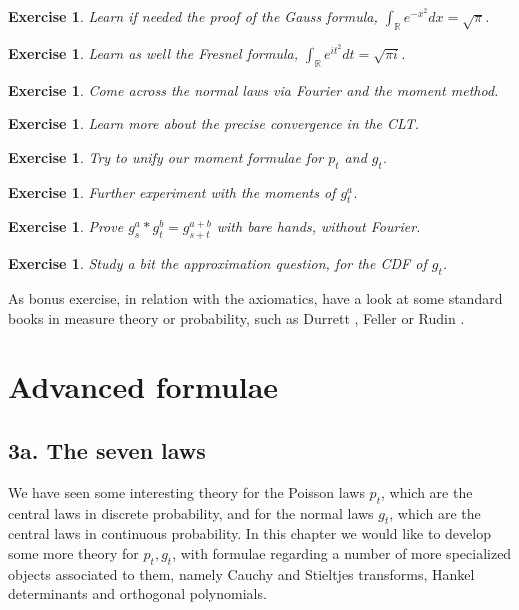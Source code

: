 \documentclass[12pt]{amsbook}
\newtheorem{exercise}[theorem]{Exercise}
\begin{document}
\begin{exercise}
Learn if needed the proof of the Gauss formula, $\int_\mathbb Re^{-x^2}dx=\sqrt{\pi}$.
\end{exercise}

\begin{exercise}
Learn as well the Fresnel formula, $\int_\mathbb R e^{it^2}dt=\sqrt{\pi i}$.
\end{exercise}

\begin{exercise}
Come across the normal laws via Fourier and the moment method.
\end{exercise}

\begin{exercise}
Learn more about the precise convergence in the CLT.
\end{exercise}

\begin{exercise}
Try to unify our moment formulae for $p_t$ and $g_t$.
\end{exercise}

\begin{exercise}
Further experiment with the moments of $g_t^a$.
\end{exercise}

\begin{exercise}
Prove $g_s^a*g_t^b=g_{s+t}^{a+b}$ with bare hands, without Fourier.
\end{exercise}

\begin{exercise}
Study a bit the approximation question, for the CDF of $g_t$.
\end{exercise}

As bonus exercise, in relation with the axiomatics, have a look at some standard books in measure theory or probability, such as Durrett \cite{dur}, Feller \cite{fel} or Rudin \cite{rud}.

\chapter{Advanced formulae}

\section*{3a. The seven laws}

We have seen some interesting theory for the Poisson laws $p_t$, which are the central laws in discrete probability, and for the normal laws $g_t$, which are the central laws in continuous probability. In this chapter we would like to develop some more theory for $p_t,g_t$, with formulae regarding a number of more specialized objects associated to them, namely Cauchy and Stieltjes transforms, Hankel determinants and orthogonal polynomials.
\end{document}
